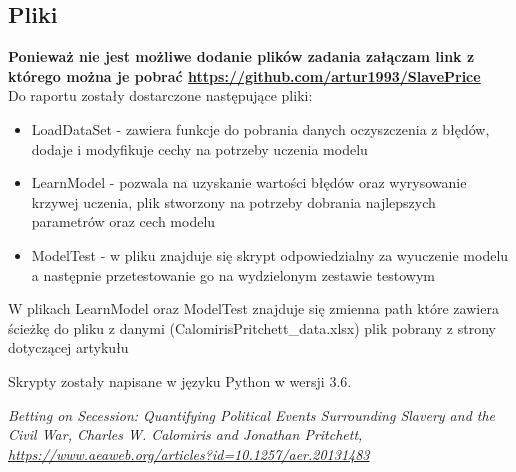 \documentclass[a4paper,12pt]{article}
\begin{document}
	\subsection{Pliki}
	\textbf{Ponieważ nie jest możliwe dodanie plików zadania załączam link z którego można je pobrać \url{https://github.com/artur1993/SlavePrice}}\\
		Do raportu zostały dostarczone następujące pliki:
		\begin{itemize}
			\item LoadDataSet - zawiera funkcje do pobrania danych oczyszczenia z błędów, dodaje i modyfikuje cechy na potrzeby uczenia modelu
			\item LearnModel - pozwala na uzyskanie wartości błędów oraz wyrysowanie krzywej uczenia, plik stworzony na potrzeby dobrania najlepszych parametrów oraz cech modelu
			\item ModelTest - w pliku znajduje się skrypt odpowiedzialny za wyuczenie modelu a następnie przetestowanie go na wydzielonym zestawie testowym
		\end{itemize}
	W plikach LearnModel oraz ModelTest znajduje się zmienna path które zawiera ścieżkę do pliku z danymi (CalomirisPritchett\_data.xlsx) plik pobrany z strony dotyczącej artykułu\cite{slave_article}
	
	Skrypty zostały napisane w języku Python w wersji 3.6.
		
	
\begin{thebibliography}{99}
	\textit {Betting on Secession: Quantifying Political Events Surrounding Slavery and the Civil War, Charles W. Calomiris and Jonathan Pritchett, \url{https://www.aeaweb.org/articles?id=10.1257/aer.20131483}}

\end{thebibliography}	
		
\end{document}
